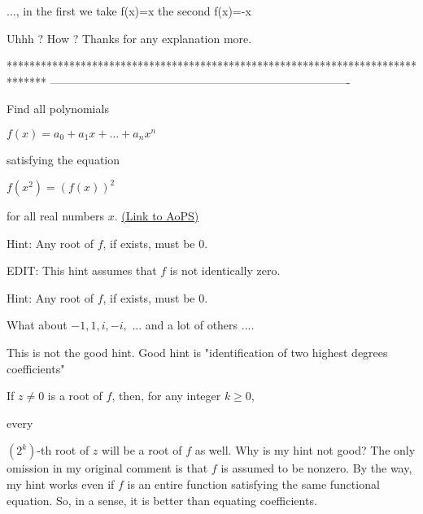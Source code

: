 \begin{solution}
	\begin{tcolorbox}..., in the first we take f(x)=x the second f(x)=-x\end{tcolorbox}
Uhhh ? How ?
Thanks for any explanation more.
\end{solution}
*******************************************************************************
-------------------------------------------------------------------------------

\begin{problem}
	Find all polynomials

$f(x) = a_{0} + a_{1}x + ... + a_{n}x^{n}$

satisfying the equation 

$f(x^{2}) = (f(x))^{2}$

for all real numbers $x$.
	\flushright \href{https://artofproblemsolving.com/community/q1h571651}{(Link to AoPS)}
\end{problem}



\begin{solution}
	Hint: Any root of $f$, if exists, must be $0$.  

EDIT: This hint assumes that $f$ is not identically zero.
\end{solution}



\begin{solution}
	\begin{tcolorbox}Hint: Any root of $f$, if exists, must be $0$.\end{tcolorbox}
What about $-1, 1, i, -i,$ ... and a lot of others ....

This is not the good hint. Good hint is "identification of two highest degrees coefficients"
\end{solution}



\begin{solution}
	If $z \neq 0$ is a root of $f$, then, for any integer $k \geq 0$, \begin{bolded}every\end{bolded} $\left(2^k\right)$-th root of $z$ will be a root of $f$ as well.  Why is my hint not good?  The only omission in my original comment is that $f$ is assumed to be nonzero.  By the way, my hint works even if $f$ is an entire function satisfying the same functional equation.  So, in a sense, it is better than equating coefficients.
\end{solution}



